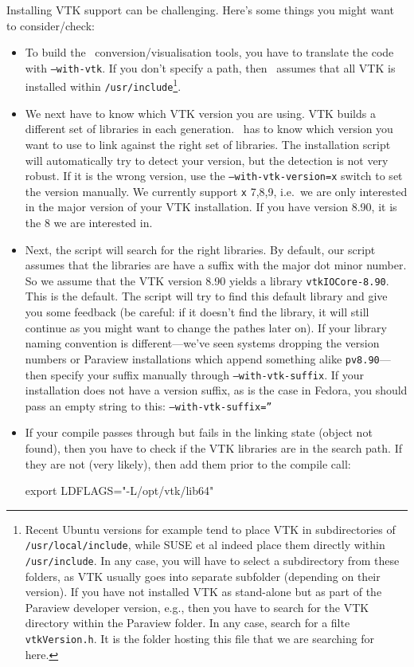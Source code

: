 \noindent
Installing VTK support can be challenging. 
Here's some things you might want to consider/check:

\begin{itemize}
  \item To build the \Peano\ conversion/visualisation tools, you have to
  translate the code with \texttt{--with-vtk}. If you don't
  specify a path, then \Peano\ assumes that all VTK is installed 
  within \texttt{/usr/include}\footnote{Recent Ubuntu
  versions for example tend to place VTK in subdirectories of
  \texttt{/usr/local/include}, while SUSE et al indeed place them directly
  within \texttt{/usr/include}. In any case, you will have to select a
  subdirectory from these folders, as VTK usually goes into separate subfolder (depending on their
  version). If you have not installed VTK as stand-alone but as part of the
  Paraview developer version, e.g., then you have to search for the VTK
  directory within the Paraview folder. In any case, search for a
  filte \texttt{vtkVersion.h}. It is the folder hosting this file that we are
  searching for here.}.
  \item We next have to know which VTK version you are using. VTK builds a
  different set of libraries in each generation. \Peano\ has to know which
  version you want to use to link against the right set of libraries. The
  installation script will automatically try to detect your version, but the
  detection is not very robust. If it is the wrong version, use the
  \texttt{--with-vtk-version=x} switch to set the version manually. We currently
  support \texttt{x} 7,8,9, i.e.~we are only interested in the major version of
  your VTK installation. If you have version 8.90, it is the 8 we are interested
  in.
  \item Next, the script will search for the right libraries. By default, our
  script assumes that the libraries are have a suffix with the major dot minor
  number. So we assume that the VTK version 8.90 yields a library
  \texttt{vtkIOCore-8.90}. This is the default. The script will try to find this
  default library and give you some feedback (be careful: if it doesn't find
  the library, it will still continue as you might want to change the pathes
  later on). If your library naming convention is different---we've seen
  systems dropping the version numbers or Paraview installations which append
  something alike \texttt{pv8.90}---then specify your suffix manually through
  \texttt{--with-vtk-suffix}. If your installation does not have a version suffix,
  as is the case in Fedora, you should pass an empty string to this:
  \texttt{--with-vtk-suffix=''}
  \item If your compile passes through but fails in the linking state (object
  not found), then you have to check if the VTK libraries are in the search
  path. If they are not (very likely), then add them prior to the compile call:
\begin{code}
export LDFLAGS="-L/opt/vtk/lib64"
\end{code}
\end{itemize}


